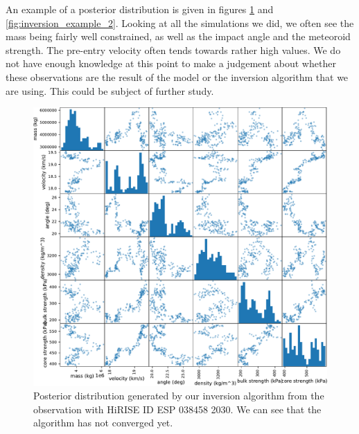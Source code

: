 An example of a posterior distribution is given in figures \ref{fig:inversion_example_1} and \ref{fig:inversion_example_2}. Looking at all the simulations we did, we often see the mass being fairly well constrained, as well as the impact angle and the meteoroid strength. The pre-entry velocity often tends towards rather high values. We do not have enough knowledge at this point to make a judgement about whether these observations are the result of the model or the inversion algorithm that we are using. This could be subject of further study.

\begin{figure}
    \centering
    \includegraphics[width=\textwidth]{figures/posterior_ESP_038458_2030}
    \caption{Posterior distribution generated by our inversion algorithm from the observation with HiRISE ID ESP 038458 2030. We can see that the algorithm has not converged yet.}
    \label{fig:inversion_example_1}
\end{figure}

